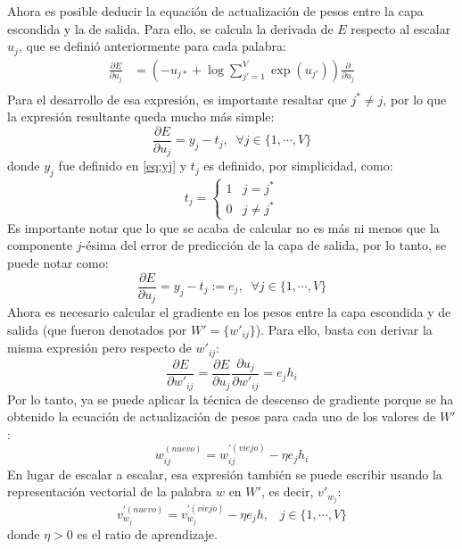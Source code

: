 Ahora es posible deducir la equación de actualización de pesos entre la capa escondida y la de salida. Para ello, se calcula
la derivada de $E$ respecto al escalar $u_j$, que se definió anteriormente para cada palabra:
\begin{equation}
  \begin{split}
  \frac{\partial E}{\partial u_j} & = \left(-u_{j*}+ \log\sum_{j'=1}^V\exp(u_{j'})\right)\frac{\partial}{\partial u_j} \\
  \end{split}
\end{equation}
Para el desarrollo de esa expresión, es importante resaltar que $j^*\neq j$, por lo que la expresión resultante queda mucho
más simple:
\begin{equation}
  \frac{\partial E}{\partial u_j} = y_j - t_j, \;\; \forall j \in \{1, \cdots, V\}
\end{equation}
donde $y_j$ fue definido en \ref*{eq:yj} y $t_j$ es definido, por simplicidad, como:
\[ t_j = \begin{cases}
  1 & j = j^* \\
  0 & j \neq j^*
\end{cases}
\]
Es importante notar que lo que se acaba de calcular no es más ni menos que la componente $j$-ésima del error de predicción de la capa de salida, por lo tanto,
se puede notar como:
\begin{equation}\label{eq:ej}
  \frac{\partial E}{\partial u_j} = y_j - t_j := e_j, \;\; \forall j \in \{1, \cdots, V\}
\end{equation}
Ahora es necesario calcular el gradiente en los pesos entre la capa escondida y de salida (que fueron denotados por $W'=\{w'_{ij}\}$). Para ello,
basta con derivar la misma expresión pero respecto de $w'_{ij}$:
\begin{equation}
  \frac{\partial E}{\partial w'_{ij}} = \frac{\partial E}{\partial u_j} \frac{\partial u_j}{\partial w'_{ij}} = e_j h_i
\end{equation}
Por lo tanto, ya se puede aplicar la técnica de descenso de gradiente porque se ha obtenido la ecuación de actualización de pesos para cada uno de los valores de $W'$:
\[
  w_{ij}^{(nuevo)} = w_{ij}^{'(viejo)} - \eta e_jh_i
\]
En lugar de escalar a escalar, esa expresión también se puede escribir usando la representación vectorial de la palabra $w$ en $W'$, es decir, $v'_{w_j}$:
\[
  v_{w_j}^{'(nuevo)}= v_{w_j}^{'(viejo)} - \eta e_j h, \;\;\; j \in \{1, \cdots, V\}
\]
donde $\eta > 0$ es el ratio de aprendizaje.

